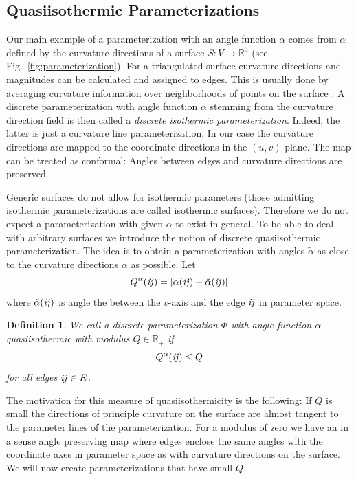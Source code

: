 \documentclass[twoside]{article}
\newtheorem{definition}{Definition}[section]
\begin{document}
\subsection{Quasiisothermic Parameterizations}
Our main example of a parameterization with an angle function $\alpha$ comes
from $\alpha$ defined by the curvature directions of a surface $S:V\to
\mathbb R^3$ (see Fig.~\ref{fig:parameterization}). For a triangulated surface 
curvature directions and magnitudes can be calculated and assigned to edges. This 
is usually done by averaging curvature information over neighborhoods of points 
on the surface \cite{CohMor03}. A discrete parameterization 
with angle function $\alpha$ stemming from the curvature direction field is then called a
\emph{discrete isothermic parameterization}. Indeed, the latter is just a
curvature line parameterization. In our case the curvature directions
are mapped to the coordinate directions in the $(u,v)$-plane. The map can be
treated as conformal: Angles between edges and curvature directions are 
preserved.

Generic surfaces do not allow for isothermic parameters (those admitting
isothermic parameterizations are called isothermic surfaces). Therefore we do
not expect a parameterization with given $\alpha$ to exist in general. To be
able to deal with arbitrary surfaces we introduce the notion of discrete
quasiisothermic parameterization. The idea is to obtain a parameterization with
angles $\tilde\alpha$ as close to the curvature directions $\alpha$ as possible.
Let
\begin{equation}
Q^\alpha(\mathrm{\it{ij}})=\left|\alpha(\mathrm{\it{ij}}) - \tilde\alpha(\mathrm{\it{ij}})\right|
\label{eq:quasiisothermicity}
\end{equation}
where $\tilde\alpha(\mathrm{\it{ij}})$ is angle the between the $v$-axis and the edge $\mathrm{\it{ij}}$ in 
parameter space.
\begin{definition}
We call a discrete parameterization $\Phi$ with angle function $\alpha$ 
\emph{quasiisothermic} with modulus $Q\in \mathbb R_+$ if
\begin{equation}
Q^\alpha(\mathrm{\it{ij}}) \leq Q
\end{equation}
for all edges $\mathrm{\it{ij}}\in E$.
\end{definition}
The motivation for this measure of quasiisothermicity is the following: If $Q$ is small
the directions of principle curvature on the surface are almost tangent to the parameter 
lines of the parameterization. For a modulus of zero we have an in a sense angle 
preserving map where edges enclose the same angles with the coordinate axes in 
parameter space as with curvature directions on the surface. We will now 
create parameterizations that have small $Q$.
\end{document}
